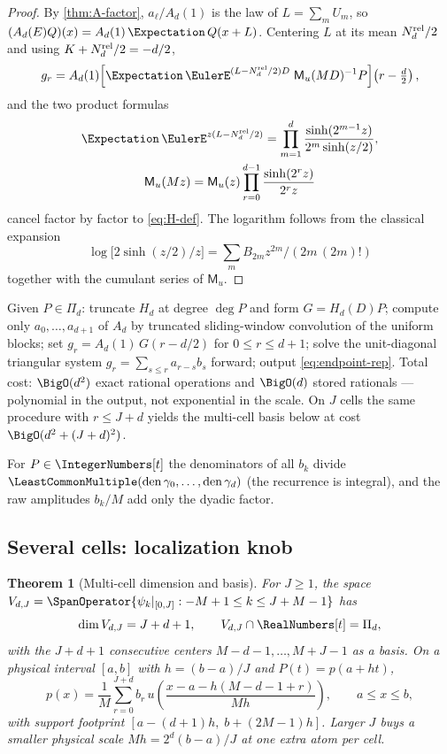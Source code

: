 \documentclass[11pt,oneside]{article}
\numberwithin{equation}{section}
\newtheorem{theorem}{Theorem}[section]
\theoremstyle{definition}
\theoremstyle{remark}
\newcommand{\MM}{\mathsf M}
\newcommand{\PiD}{\Pi_d}
\begin{document}
\begin{proof}
By \cref{thm:A-factor}, $a_\ell/A_d(1)$ is the law of
$L=\sum_mU_m$, so $(A_d(E)Q)(x)=A_d(1)\,\Expectation\,Q(x+L)$.  Centering $L$
at its mean $N_d^{\rm rel}/2$ and using
$K+N_d^{\rm rel}/2=-d/2$,
\[
 g_r=A_d(1)\Bigl[
 \Expectation\,\EulerE^{(L-N_d^{\rm rel}/2)D}\;\MM_u(MD)^{-1}P
 \Bigr]\!\left(r-\tfrac d2\right),
\]
and the two product formulas
\begin{gather*}
 \Expectation\,\EulerE^{z(L-N_d^{\rm rel}/2)}
 =\prod_{m=1}^{d}\frac{\sinh(2^{m-1}z)}{2^{m}\sinh(z/2)},
 \\
 \MM_u(Mz)=\MM_u(z)\prod_{r=0}^{d-1}\frac{\sinh(2^{r}z)}{2^{r}z}
\end{gather*}
cancel factor by factor to \eqref{eq:H-def}.  The logarithm follows
from the classical expansion
\[
\log\bigl[2\sinh(z/2)/z\bigr]
=\sum_mB_{2m}z^{2m}/(2m\,(2m)!)
\]
together with the cumulant series
of $\MM_u$.
\end{proof}

\begin{algorithm}
\label{alg:fast}
Given $P\in\PiD$: truncate $H_d$ at degree $\deg P$ and form
$G=H_d(D)P$; compute only $a_0,\dots,a_{d+1}$ of $A_d$ by truncated
sliding-window convolution of the uniform blocks; set
$g_r=A_d(1)\,G(r-d/2)$ for $0\le r\le d+1$; solve the unit-diagonal
triangular system $g_r=\sum_{s\le r}a_{r-s}b_s$ forward; output
\eqref{eq:endpoint-rep}.  Total cost: $\BigO(d^{2})$ exact rational
operations and $\BigO(d)$ stored rationals --- polynomial in the
output, not exponential in the scale.  On $J$ cells the same
procedure with $r\le J+d$ yields the multi-cell basis below at cost
$\BigO(d^{2}+(J+d)^{2})$.
\end{algorithm}

For $P\in\IntegerNumbers[t]$ the denominators of all $b_k$ divide
$\LeastCommonMultiple (\operatorname{den}\gamma_0,\dots,
\operatorname{den}\gamma_d)$ (the recurrence is integral), and the
raw amplitudes $b_k/M$ add only the dyadic factor.

\subsection{Several cells: localization knob}

\begin{theorem}[Multi-cell dimension and basis]
\label{thm:multicell}
For $J\ge1$, the space
$V_{d,J}=\SpanOperator\{\psi_k|_{[0,J]}:-M+1\le k\le J+M-1\}$ has
\begin{equation}
 \dim V_{d,J}=J+d+1,
 \qquad V_{d,J}\cap\RealNumbers[t]=\PiD,
 \label{eq:multicell-dim}
\end{equation}
with the $J+d+1$ consecutive centers $M-d-1,\dots,M+J-1$ as a basis.
On a physical interval $[a,b]$ with $h=(b-a)/J$ and
$P(t)=p(a+ht)$,
\begin{equation}
 p(x)=\frac1M\sum_{r=0}^{J+d}b_r\,
 u\!\left(\frac{x-a-h(M-d-1+r)}{Mh}\right),
 \qquad a\le x\le b,
 \label{eq:physical}
\end{equation}
with support footprint $[a-(d+1)h,\;b+(2M-1)h]$.  Larger $J$ buys a
smaller physical scale $Mh=2^{d}(b-a)/J$ at one extra atom per cell.
\end{theorem}
\end{document}
